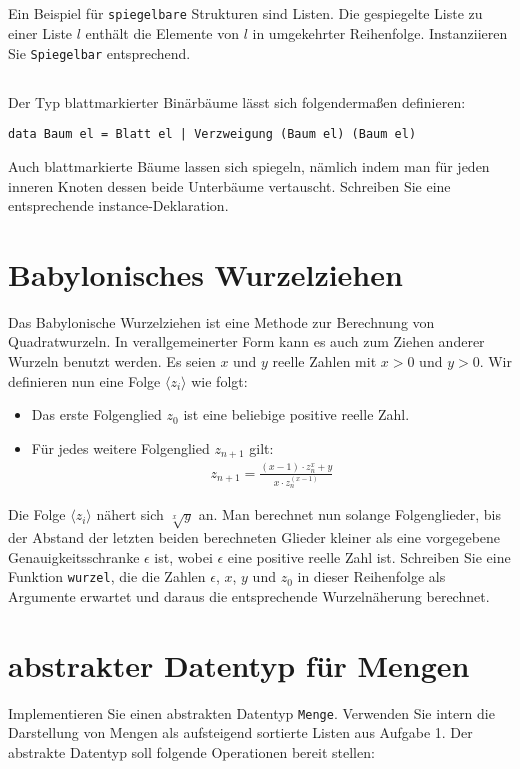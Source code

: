 \documentclass[
  10pt,                   %
  DIV12,
  german,                 %
  oneside,                %
  parskip=half,           %
  headings=normal,        %
  captions=tableheading,  %
]{scrartcl}
\begin{document}
\subsection{}
Ein Beispiel für \lstinline|spiegelbare| Strukturen sind Listen. Die gespiegelte Liste zu einer
Liste $l$ enthält die Elemente von $l$ in umgekehrter Reihenfolge. Instanziieren Sie
\lstinline|Spiegelbar| entsprechend.
\subsection{} 
Der Typ blattmarkierter Binärbäume lässt sich folgendermaßen definieren:
\begin{lstlisting}
data Baum el = Blatt el | Verzweigung (Baum el) (Baum el)
\end{lstlisting}
Auch blattmarkierte Bäume lassen sich spiegeln, nämlich indem man für jeden
inneren Knoten dessen beide Unterbäume vertauscht. Schreiben Sie eine entsprechende
instance-Deklaration.

\section{Babylonisches Wurzelziehen}
Das Babylonische Wurzelziehen ist eine Methode zur Berechnung von Quadratwurzeln.
In verallgemeinerter Form kann es auch zum Ziehen anderer Wurzeln benutzt werden.
Es seien $x$ und $y$ reelle Zahlen mit $x > 0$ und $y > 0$. Wir definieren nun eine Folge $\langle z_i \rangle$
wie folgt:
\begin{itemize}
  \item Das erste Folgenglied $z_0$ ist eine beliebige positive reelle Zahl.
  \item Für jedes weitere Folgenglied $z_{n+1}$ gilt: \\
  \begin{align*}
  z_{n+1} = \frac{(x-1) \cdot z_n^x + y}{x \cdot z_n^{(x-1)}}
  \end{align*}
\end{itemize}
Die Folge $\langle z_i \rangle$ nähert sich $\sqrt[x]{y}$ an. Man berechnet nun solange Folgenglieder, bis der
Abstand der letzten beiden berechneten Glieder kleiner als eine vorgegebene Genauigkeitsschranke
$\epsilon$ ist, wobei $\epsilon$ eine positive reelle Zahl ist. Schreiben Sie eine Funktion
\lstinline|wurzel|, die die Zahlen $\epsilon$, $x$, $y$ und $z_0$ in dieser Reihenfolge als Argumente erwartet und
daraus die entsprechende Wurzelnäherung berechnet.

\section{abstrakter Datentyp für Mengen}
Implementieren Sie einen abstrakten Datentyp \lstinline|Menge|. Verwenden Sie intern die Darstellung von Mengen als aufsteigend sortierte Listen aus Aufgabe 1.
Der abstrakte Datentyp soll folgende Operationen bereit stellen:
\end{document}
